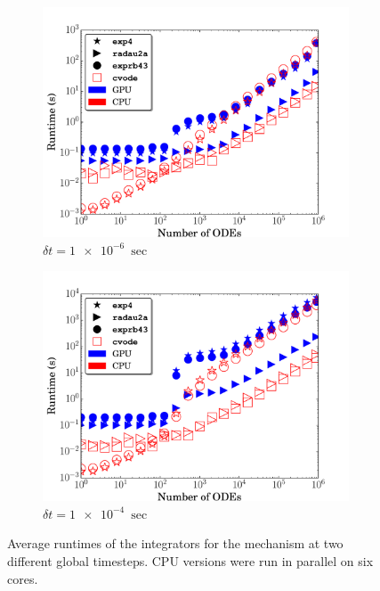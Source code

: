 \documentclass[preprint]{elsarticle}
\begin{document}
\begin{figure}
  \centering
  \begin{subfigure}{0.49\textwidth}
      \includegraphics[width=\linewidth]{H2_1e-06_cpuvsgpu.pdf}
      \caption{$\delta t = \SI{1e-6}{\sec}$}   
  \end{subfigure}
  \begin{subfigure}{0.49\textwidth}
      \includegraphics[width=\linewidth]{H2_1e-04_cpuvsgpu.pdf}
      \caption{$\delta t = \SI{1e-4}{\sec}$}
  \end{subfigure}
  \caption{Average runtimes of the integrators for the  mechanism at two different global timesteps. 
  CPU versions were run in parallel on six cores.}
  \label{F:H2_perf}
\end{figure}
\end{document}
